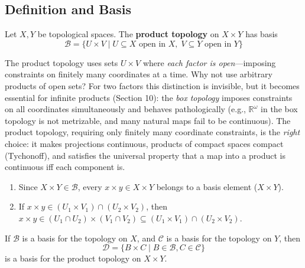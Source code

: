 \documentclass[11pt]{report}
\begin{document}
\subsection{Definition and Basis}

\begin{defbox}
Let $X, Y$ be topological spaces. The \textbf{product topology} on $X \times Y$ has basis
\[\mathcal{B} = \{U \times V \mid U \subseteq X \text{ open in } X, \; V \subseteq Y \text{ open in } Y\}\]
\end{defbox}

\begin{rembox}
The product topology uses sets $U \times V$ where \emph{each factor is open}---imposing constraints on finitely many coordinates at a time. Why not use arbitrary products of open sets? For two factors this distinction is invisible, but it becomes essential for infinite products (Section 10): the \emph{box topology} imposes constraints on all coordinates simultaneously and behaves pathologically (e.g., $\mathbb{R}^\omega$ in the box topology is not metrizable, and many natural maps fail to be continuous). The product topology, requiring only finitely many coordinate constraints, is the \emph{right} choice: it makes projections continuous, products of compact spaces compact (Tychonoff), and satisfies the universal property that a map into a product is continuous iff each component is.
\end{rembox}

\begin{rembox}
\begin{enumerate}
    \item Since $X \times Y \in \mathcal{B}$, every $x \times y \in X \times Y$ belongs to a basis element ($X \times Y$).
    \item If $x \times y \in (U_1 \times V_1) \cap (U_2 \times V_2)$, then $x \times y \in (U_1 \cap U_2) \times (V_1 \cap V_2) \subseteq (U_1 \times V_1) \cap (U_2 \times V_2)$. \checkmark
\end{enumerate}
\end{rembox}

\begin{thmbox}
If $\mathcal{B}$ is a basis for the topology on $X$, and $\mathcal{C}$ is a basis for the topology on $Y$, then 
\[\mathcal{D} = \{B \times C \mid B \in \mathcal{B}, C \in \mathcal{C}\}\]
is a basis for the product topology on $X \times Y$.
\end{thmbox}
\end{document}
